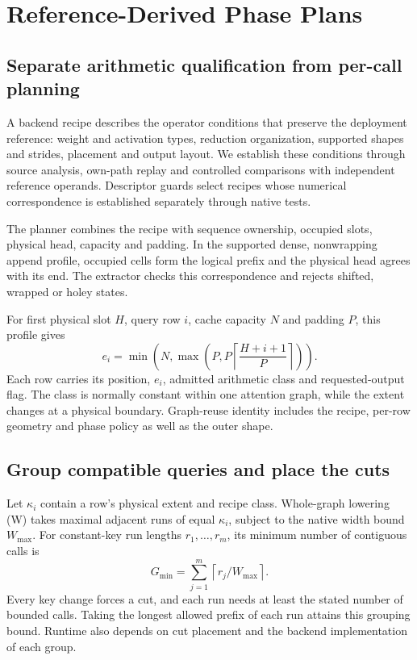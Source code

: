 \section{Reference-Derived Phase Plans}
\label{sec:method}
\subsection{Separate arithmetic qualification from per-call planning}
A backend recipe describes the operator conditions that preserve the deployment reference: weight and activation types, reduction organization, supported shapes and strides, placement and output layout. We establish these conditions through source analysis, own-path replay and controlled comparisons with independent reference operands. Descriptor guards select recipes whose numerical correspondence is established separately through native tests.

The planner combines the recipe with sequence ownership, occupied slots, physical head, capacity and padding. In the supported dense, nonwrapping append profile, occupied cells form the logical prefix and the physical head agrees with its end. The extractor checks this correspondence and rejects shifted, wrapped or holey states.

For first physical slot $H$, query row $i$, cache capacity $N$ and padding $P$, this profile gives
\begin{equation}
 e_i=\min\!\left(N,\max\!\left(P,P\left\lceil\frac{H+i+1}{P}\right\rceil\right)\right).
 \label{eq:extent}
\end{equation}
Each row carries its position, $e_i$, admitted arithmetic class and requested-output flag. The class is normally constant within one attention graph, while the extent changes at a physical boundary. Graph-reuse identity includes the recipe, per-row geometry and phase policy as well as the outer shape.

\subsection{Group compatible queries and place the cuts}
Let $\kappa_i$ contain a row's physical extent and recipe class. Whole-graph lowering (W) takes maximal adjacent runs of equal $\kappa_i$, subject to the native width bound $W_{\max}$. For constant-key run lengths $r_1,\ldots,r_m$, its minimum number of contiguous calls is
\begin{equation}
 G_{\min}=\sum_{j=1}^{m}\left\lceil r_j/W_{\max}\right\rceil.
 \label{eq:groups}
\end{equation}
Every key change forces a cut, and each run needs at least the stated number of bounded calls. Taking the longest allowed prefix of each run attains this grouping bound. Runtime also depends on cut placement and the backend implementation of each group.

